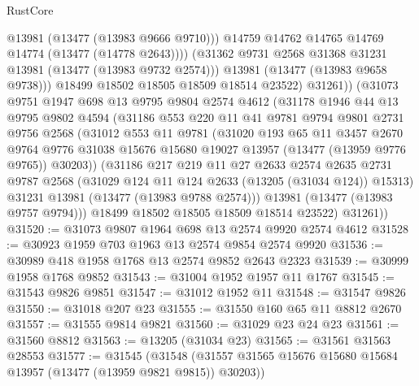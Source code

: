 \begin{lexlean}{RustCore}
\begin{coremodule}
                    @13981
                    (@13477 (@13983 @9666 @9710)))
                  @14759
                  @14762
                  @14765
                  @14769
                  @14774
                  (@13477 (@14778 @2643))))
              (@31362 @9731 @2568 @31368 @31231 @13981 (@13477 (@13983 @9732 @2574)))
              @13981
              (@13477 (@13983 @9658 @9738)))
            @18499
            @18502
            @18505
            @18509
            @18514
            @23522)
          @31261))
      (@31073
        @9751
        @1947
        @698
        @13
        @9795
        @9804
        @2574
        @4612
        (@31178
          @1946
          @44
          @13
          @9795
          @9802
          @4594
          (@31186
            @553
            @220
            @11
            @41
            @9781
            @9794
            @9801
            @2731
            @9756
            @2568
            (@31012
              @553
              @11
              @9781
              (@31020
                @193
                @65
                @11
                @3457
                @2670
                @9764
                @9776
                @31038
                @15676
                @15680
                @19027
                @13957
                (@13477 (@13959 @9776 @9765))
                @30203))
            (@31186
              @217
              @219
              @11
              @27
              @2633
              @2574
              @2635
              @2731
              @9787
              @2568
              (@31029 @124 @11 @124 @2633 (@13205 (@31034 @124)) @15313)
              @31231
              @13981
              (@13477 (@13983 @9788 @2574)))
            @13981
            (@13477 (@13983 @9757 @9794)))
          @18499
          @18502
          @18505
          @18509
          @18514
          @23522)
        @31261))
@31520 := @31073 @9807 @1964 @698 @13 @2574 @9920 @2574 @4612
@31528 := @30923 @1959 @703 @1963 @13 @2574 @9854 @2574 @9920
@31536 := @30989 @418 @1958 @1768 @13 @2574 @9852 @2643 @2323
@31539 := @30999 @1958 @1768 @9852
@31543 := @31004 @1952 @1957 @11 @1767
@31545 := @31543 @9826 @9851
@31547 := @31012 @1952 @11
@31548 := @31547 @9826
@31550 := @31018 @207 @23
@31555 := @31550 @160 @65 @11 @8812 @2670
@31557 := @31555 @9814 @9821
@31560 := @31029 @23 @24 @23
@31561 := @31560 @8812
@31563 := @13205 (@31034 @23)
@31565 := @31561 @31563 @28553
@31577 := @31545
    (@31548 (@31557 @31565 @15676 @15680 @15684 @13957 (@13477 (@13959 @9821 @9815)) @30203))

\end{coremodule}
\end{lexlean}
